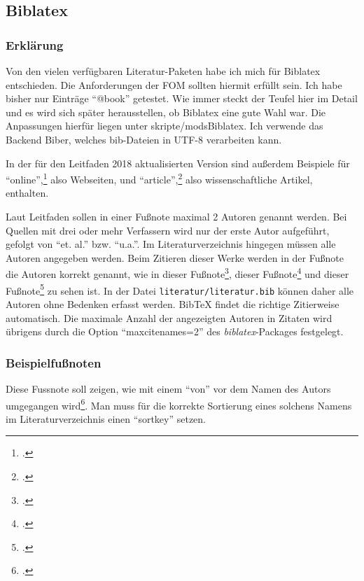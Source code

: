 
\subsection{Biblatex}
\subsubsection{Erklärung}
Von den vielen verfügbaren Literatur-Paketen habe ich mich für Biblatex entschieden. Die Anforderungen der FOM sollten hiermit erfüllt sein. Ich habe bisher nur Einträge \enquote{@book} getestet. Wie immer steckt der Teufel hier im Detail und es wird sich später herausstellen, ob Biblatex eine gute Wahl war. Die Anpassungen hierfür liegen unter skripte/modsBiblatex. Ich verwende das Backend Biber, welches bib-Dateien in UTF-8 verarbeiten kann.

In der für den Leitfaden 2018 aktualisierten Version sind außerdem Beispiele für \enquote{online},\footcite[Vgl.][]{website:angular:aboutAngular} also Webseiten, und \enquote{article},\footcite[Vgl.][S. 140]{Decker2009} also wissenschaftliche Artikel, enthalten.

Laut Leitfaden sollen in einer Fußnote maximal 2 Autoren genannt werden. Bei Quellen mit drei oder 
mehr Verfassern wird nur der erste Autor aufgeführt, gefolgt von
\enquote{et. al.} bzw. \enquote{u.a.}. Im Literaturverzeichnis hingegen müssen alle Autoren angegeben werden.
Beim Zitieren dieser Werke werden in der Fußnote die Autoren korrekt genannt, wie in 
dieser Fußnote\footcite[Vgl.][S. 1]{Balzert0.2008},
dieser Fußnote\footcite[Vgl.][S. 1]{Balzert1.2008} und
dieser Fußnote\footcite[Vgl.][S. 1]{Balzert2.2008} zu sehen ist.
In der Datei \texttt{literatur/literatur.bib} können daher alle Autoren ohne Bedenken erfasst werden.
BibTeX findet die richtige Zitierweise automatisch.
Die maximale Anzahl der angezeigten Autoren in Zitaten wird übrigens durch die Option \enquote{maxcitenames=2} des
\textit{biblatex}-Packages festgelegt.

\subsubsection{Beispielfußnoten}
Diese Fussnote soll zeigen, wie mit einem \enquote{von} vor dem Namen des Autors
umgegangen wird\footcite[Vgl.][S. 1]{Lucke2018}. Man muss für die korrekte
Sortierung eines solchens Namens im Literaturverzeichnis einen \enquote{sortkey}
setzen.

